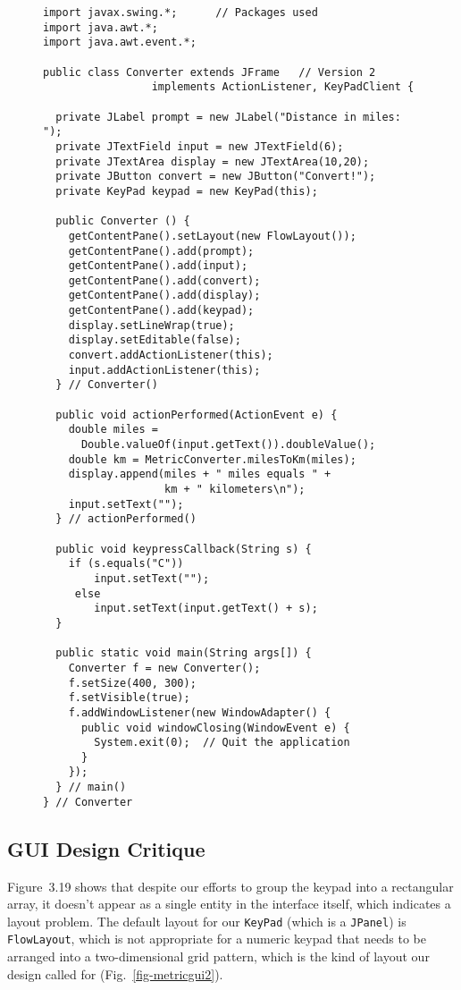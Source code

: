 \begin{figure}[p]
\jjjprogstart
\begin{jjjlisting}[27pc]
\begin{lstlisting}
import javax.swing.*;      // Packages used 
import java.awt.*;
import java.awt.event.*;

public class Converter extends JFrame   // Version 2
                 implements ActionListener, KeyPadClient { 

  private JLabel prompt = new JLabel("Distance in miles: "); 
  private JTextField input = new JTextField(6);
  private JTextArea display = new JTextArea(10,20);
  private JButton convert = new JButton("Convert!");
  private KeyPad keypad = new KeyPad(this);
  
  public Converter () {
    getContentPane().setLayout(new FlowLayout()); 
    getContentPane().add(prompt);
    getContentPane().add(input);
    getContentPane().add(convert);  
    getContentPane().add(display);
    getContentPane().add(keypad);
    display.setLineWrap(true);
    display.setEditable(false);
    convert.addActionListener(this);   
    input.addActionListener(this);
  } // Converter()
  
  public void actionPerformed(ActionEvent e) {
    double miles = 
      Double.valueOf(input.getText()).doubleValue();
    double km = MetricConverter.milesToKm(miles);
    display.append(miles + " miles equals " + 
                   km + " kilometers\n");
    input.setText("");
  } // actionPerformed()

  public void keypressCallback(String s) {
    if (s.equals("C"))
        input.setText("");
     else
        input.setText(input.getText() + s);
  }

  public static void main(String args[]) {
    Converter f = new Converter();
    f.setSize(400, 300);  
    f.setVisible(true);
    f.addWindowListener(new WindowAdapter() {  
      public void windowClosing(WindowEvent e) {
        System.exit(0);  // Quit the application
      }
    });
  } // main()
} // Converter
\end{lstlisting}
\end{jjjlisting}
\label{fig-convertclass2}
\end{figure}

\subsection{GUI Design Critique}
\noindent Figure~3.19 shows that despite our
efforts to group the keypad into a rectangular array, it doesn't
appear as a single entity in the interface itself, which indicates a
layout problem.  The default layout for our {\tt KeyPad} (which is a
{\tt JPanel}) is {\tt FlowLayout}, which is not appropriate for a
numeric keypad that needs to be arranged into a two-dimensional grid
pattern, which is the kind of layout our design called for
(Fig.~\ref{fig-metricgui2}).

